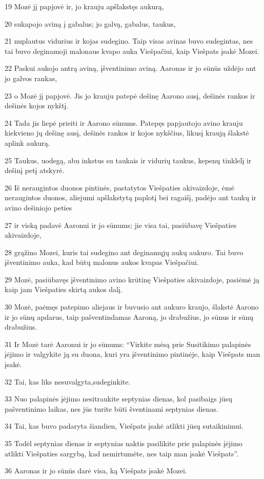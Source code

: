 \par 19 Mozė jį papjovė ir, jo krauju apšlakstęs aukurą, 
\par 20 sukapojo aviną į gabalus; jo galvą, gabalus, taukus, 
\par 21 nuplautus vidurius ir kojas sudegino. Taip visas avinas buvo sudegintas, nes tai buvo deginamoji malonaus kvapo auka Viešpačiui, kaip Viešpats įsakė Mozei. 
\par 22 Paskui aukojo antrą aviną, įšventinimo aviną. Aaronas ir jo sūnūs uždėjo ant jo galvos rankas, 
\par 23 o Mozė jį papjovė. Jis jo krauju patepė dešinę Aarono ausį, dešinės rankos ir dešinės kojos nykštį. 
\par 24 Tada jis liepė prieiti ir Aarono sūnums. Patepęs papjautojo avino krauju kiekvieno jų dešinę ausį, dešinės rankos ir kojos nykščius, likusį kraują šlakstė aplink aukurą. 
\par 25 Taukus, uodegą, abu inkstus su taukais ir vidurių taukus, kepenų tinklelį ir dešinį petį atskyrė. 
\par 26 Iš neraugintos duonos pintinės, pastatytos Viešpaties akivaizdoje, ėmė neraugintos duonos, aliejumi apšlakstytą paplotį bei ragaišį, padėjo ant taukų ir avino dešiniojo peties 
\par 27 ir viską padavė Aaronui ir jo sūnums; jie visa tai, pasiūbavę Viešpaties akivaizdoje, 
\par 28 grąžino Mozei, kuris tai sudegino ant deginamųjų aukų aukuro. Tai buvo įšventinimo auka, kad būtų malonus aukos kvapas Viešpačiui. 
\par 29 Mozė, pasiūbavęs įšventinimo avino krūtinę Viešpaties akivaizdoje, pasiėmė ją kaip jam Viešpaties skirtą aukos dalį. 
\par 30 Mozė, paėmęs patepimo aliejaus ir buvusio ant aukuro kraujo, šlakstė Aarono ir jo sūnų apdarus, taip pašventindamas Aaroną, jo drabužius, jo sūnus ir sūnų drabužius. 
\par 31 Ir Mozė tarė Aaronui ir jo sūnums: “Virkite mėsą prie Susitikimo palapinės įėjimo ir valgykite ją su duona, kuri yra įšventinimo pintinėje, kaip Viešpats man įsakė. 
\par 32 Tai, kas liks nesuvalgyta,­sudeginkite. 
\par 33 Nuo palapinės įėjimo nesitraukite septynias dienas, kol pasibaigs jūsų pašventinimo laikas, nes jūs turite būti šventinami septynias dienas. 
\par 34 Tai, kas buvo padaryta šiandien, Viešpats įsakė atlikti jūsų sutaikinimui. 
\par 35 Todėl septynias dienas ir septynias naktis pasilikite prie palapinės įėjimo atlikti Viešpaties sargybą, kad nemirtumėte, nes taip man įsakė Viešpats”. 
\par 36 Aaronas ir jo sūnūs darė visa, ką Viešpats įsakė Mozei.




